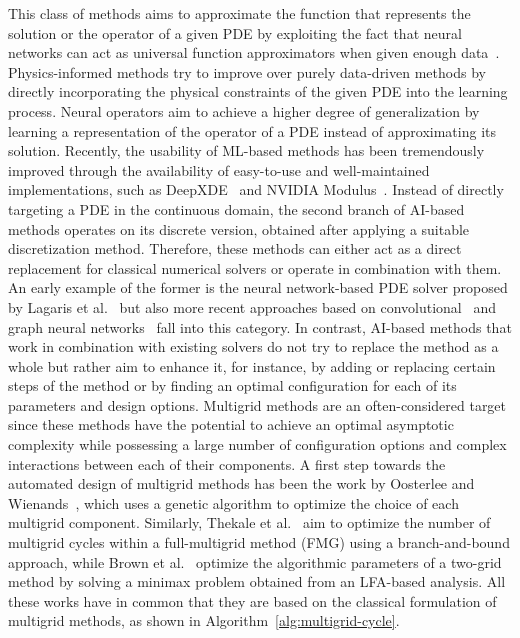 This class of methods aims to approximate the function that represents the solution or the operator of a given PDE by exploiting the fact that neural networks can act as universal function approximators when given enough data~\cite{hornik1989multilayer}.
Physics-informed methods try to improve over purely data-driven methods by directly incorporating the physical constraints of the given PDE into the learning process.
Neural operators aim to achieve a higher degree of generalization by learning a representation of the operator of a PDE instead of approximating its solution.
Recently, the usability of ML-based methods has been tremendously improved through the availability of easy-to-use and well-maintained implementations, such as DeepXDE~\cite{lu2021deepxde} and NVIDIA Modulus~\cite{hennigh2021nvidia}. 
Instead of directly targeting a PDE in the continuous domain, the second branch of AI-based methods operates on its discrete version, obtained after applying a suitable discretization method.
Therefore, these methods can either act as a direct replacement for classical numerical solvers or operate in combination with them.
An early example of the former is the neural network-based PDE solver proposed by Lagaris et al.~\cite{lagaris1998artificial} but also more recent approaches based on convolutional~\cite{thuerey2020deep} and graph neural networks~\cite{pfaff2020learning} fall into this category.
In contrast, AI-based methods that work in combination with existing solvers do not try to replace the method as a whole but rather aim to enhance it, for instance, by adding or replacing certain steps of the method or by finding an optimal configuration for each of its parameters and design options.
Multigrid methods are an often-considered target since these methods have the potential to achieve an optimal asymptotic complexity while possessing a large number of configuration options and complex interactions between each of their components.
A first step towards the automated design of multigrid methods has been the work by Oosterlee and Wienands~\cite{oosterlee2003genetic}, which uses a genetic algorithm to optimize the choice of each multigrid component.
Similarly, Thekale et al.~\cite{thekale2010optimizing} aim to optimize the number of multigrid cycles within a full-multigrid method (FMG) using a branch-and-bound approach, while Brown et al.~\cite{brown2021tuning} optimize the algorithmic parameters of a two-grid method by solving a minimax problem obtained from an LFA-based analysis.
All these works have in common that they are based on the classical formulation of multigrid methods, as shown in Algorithm~\ref{alg:multigrid-cycle}.
